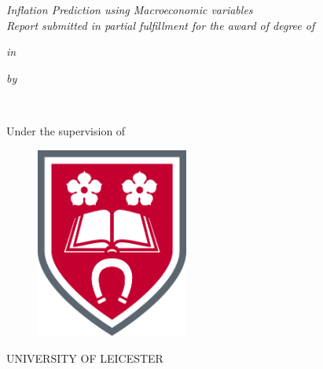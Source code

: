 \thispagestyle{empty}
\begin{center}
\vspace*{0.5cm}
    { \Large {\bfseries {\mytitle}} \par}
\vspace{2\baselineskip}
    {\textit{Inflation Prediction using Macroeconomic variables}\\
    \textit{Report submitted in partial fulfillment for 
    the award of degree of}}\par
\vspace{0.2\baselineskip}
    {\bf \degree \par}
\vspace{0.2\baselineskip}
    {\textit{in} \par}
\vspace{0.2\baselineskip}
    {\Large \bf \mydegree \par} 
\vspace{\baselineskip}
    {\textit{by} \par}
\vspace{\baselineskip}
    {{\Large {\bf \myname \\ \myrollno}} \par}
\vspace{1.5\baselineskip}
    {\large Under the supervision of \par}
\vspace{0.3\baselineskip}
    {{\Large \bf \mysupervisor} \par}
\vspace{\baselineskip}
    {\begin{figure}[!h] 
	\centering
	\includegraphics[width=50mm]{./Images/Logo.png} 
     \end{figure}
    }
    \vspace{1.5\baselineskip}
    {\large \MakeUppercase{\mydep} \par}
\vspace*{2ex}
    {\large \uppercase{University Of Leicester} \par}
\end{center}
